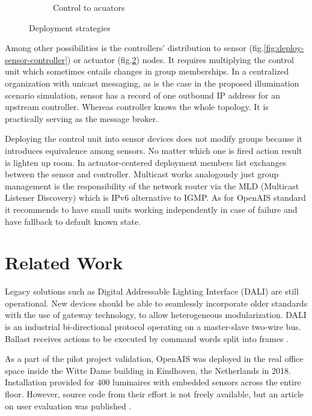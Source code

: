 \documentclass[11pt, english, a4paper, twoside]{article}
\begin{document}
\begin{figure}[h]
\begin{subfigure}[b]{0.45\textwidth}
		\caption{Control to acuators}
		\label{fig:deploy-actuator-controller}
	\end{subfigure}
	\caption{Deployment strategies}
\end{figure}

Among other possibilities is the controllers' distribution to sensor (fig.\ref{fig:deploy-sensor-controller}) or actuator (fig.\ref{fig:deploy-actuator-controller}) nodes. It requires multiplying the control unit which sometimes entails changes in group memberships. In a centralized organization with unicast messaging, as is the case in the proposed illumination scenario simulation, sensor has a record of one outbound IP address for an upstream controller. Whereas controller knows the whole topology. It is practically serving as the message broker. 

Deploying the control unit into sensor devices does not modify groups because it introduces equivalence among sensors. No matter which one is fired action result is lighten up room. In actuator-centered deployment members list exchanges between the sensor and controller. Multicast works analogously just group management is the responsibility of the network router via the MLD (Multicast Listener Discovery) which is IPv6 alternative to IGMP. As for OpenAIS standard it recommends to have small units working independently in case of failure and have fallback to default known state.

\section{Related Work} \label{related-work}
Legacy solutions such as Digital Addressable Lighting Interface (DALI) \cite{sahu_dali_2019} are still operational. New devices should be able to seamlessly incorporate older standards with the use of gateway technology, to allow heterogeneous modularization. DALI is an industrial bi-directional protocol operating on a master-slave two-wire bus. Ballast receives actions to be executed by command words split into frames \cite{dali}.

As a part of the pilot project validation, OpenAIS was deployed in the real office space inside the Witte Dame building in Eindhoven, the Netherlands in 2018. Installation provided for 400 luminaires with embedded sensors across the entire floor. However, source code from their effort is not freely available, but an article on user evaluation was published \cite{openais-pilot}.
\end{document}
